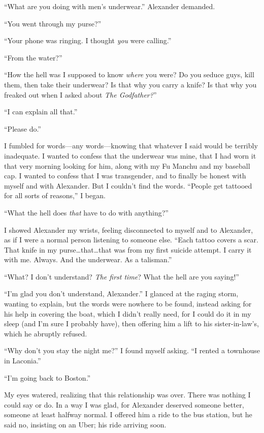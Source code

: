 ``What are you doing with men's underwear.'' Alexander demanded.

``You went through my purse?''

``Your phone was ringing. I thought \emph{you} were calling.''

``From the water?''

``How the hell was I supposed to know \emph{where} you were? Do you
seduce guys, kill them, then take their underwear? Is that why you carry
a knife? Is that why you freaked out when I asked about \emph{The
Godfather?}''

``I can explain all that.''

``Please do.''

I fumbled for words---any words---knowing that whatever I said would be
terribly inadequate. I wanted to confess that the underwear was mine,
that I had worn it that very morning looking for him, along with my Fu
Manchu and my baseball cap. I wanted to confess that I was transgender,
and to finally be honest with myself and with Alexander. But I couldn't
find the words. ``People get tattooed for all sorts of reasons,'' I
began.

``What the hell does \emph{that} have to do with anything?''

I showed Alexander my wrists, feeling disconnected to myself and to
Alexander, as if I were a normal person listening to someone else.
``Each tattoo covers a scar. That knife in my
purse\ldots that\ldots that was from my first suicide attempt. I carry
it with me. Always. And the underwear. As a talisman.''

``What? I don't understand? \emph{The first time}? What the hell are you
saying!''

``I'm glad you don't understand, Alexander.'' I glanced at the raging
storm, wanting to explain, but the words were nowhere to be found,
instead asking for his help in covering the boat, which I didn't really
need, for I could do it in my sleep (and I'm sure I probably have), then
offering him a lift to his sister-in-law's, which he abruptly refused.

``Why don't you stay the night me?'' I found myself asking. ``I rented a
townhouse in Laconia.''

``I'm going back to Boston.''

My eyes watered, realizing that this relationship was over. There was
nothing I could say or do. In a way I was glad, for Alexander deserved
someone better, someone at least halfway normal. I offered him a ride to
the bus station, but he said no, insisting on an Uber; his ride arriving
soon.

